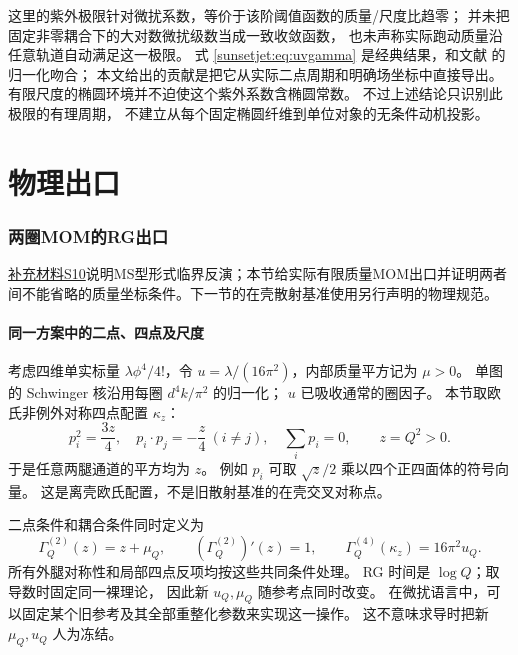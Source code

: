 \documentclass[11pt,a4paper,oneside]{ctexart}
\theoremstyle{cnplain}
\theoremstyle{definition}
\theoremstyle{remark}
\newcommand{\Q}{\mathbb Q}
\newcommand{\Z}{\mathbb Z}
\numberwithin{equation}{section}
\newcommand{\otherref}[2]{\href{#1.pdf}{#2}}
\begin{document}
这里的紫外极限针对微扰系数，等价于该阶阈值函数的质量/尺度比趋零；
并未把固定非零耦合下的大对数微扰级数当成一致收敛函数，
也未声称实际跑动质量沿任意轨道自动满足这一极限。
式 \eqref{sunsetjet:eq:uvgamma} 是经典结果，和文献
\cite[式(1)、(2)、(5)、(9)，$n=1$]{kp} 的归一化吻合；
本文给出的贡献是把它从实际二点周期和明确场坐标中直接导出。
有限尺度的椭圆环境并不迫使这个紫外系数含椭圆常数。
不过上述结论只识别此极限的有理周期，
不建立从每个固定椭圆纤维到单位对象的无条件动机投影。


\endgroup

\clearpage\part{物理出口}

\section{两圈MOM的RG出口}\label{ch:momrg}

\begingroup

\otherref{feynman_periods_supplement}{补充材料S10}说明MS型形式临界反演；本节给实际有限质量MOM出口并证明两者间不能省略的质量坐标条件。下一节的在壳散射基准使用另行声明的物理规范。

\providecommand{\Q}{\mathbb Q}
\providecommand{\SR}{S_{\mathrm R}}
\providecommand{\gphi}{\gamma_\phi}
\providecommand{\dd}{\mathcal D}
\renewcommand{\Z}{\mathcal Z}

\subsection{同一方案中的二点、四点及尺度}
考虑四维单实标量 $\lambda\phi^4/4!$，令
$u=\lambda/(16\pi^2)$，内部质量平方记为 $\mu>0$。
单图的 Schwinger 核沿用每圈 $d^4k/\pi^2$ 的归一化；
$u$ 已吸收通常的圈因子。
本节取欧氏非例外对称四点配置 $\kappa_z$：
\begin{equation}\label{momrg:eq:symmetric}
 p_i^2=\frac{3z}{4},\quad p_i\cdot p_j=-\frac z4\ (i\ne j),
 \quad \sum_i p_i=0,\qquad z=Q^2>0.
\end{equation}
于是任意两腿通道的平方均为 $z$。
例如 $p_i$ 可取 $\sqrt z/2$ 乘以四个正四面体的符号向量。
这是离壳欧氏配置，不是旧散射基准的在壳交叉对称点。

二点条件和耦合条件同时定义为
\begin{equation}\label{momrg:eq:conditions}
 \Gamma_Q^{(2)}(z)=z+\mu_Q,\qquad
 (\Gamma_Q^{(2)})'(z)=1,\qquad
 \Gamma_Q^{(4)}(\kappa_z)=16\pi^2u_Q.
\end{equation}
所有外腿对称性和局部四点反项均按这些共同条件处理。
RG 时间是 $\log Q$；取导数时固定同一裸理论，
因此新 $u_Q,\mu_Q$ 随参考点同时改变。
在微扰语言中，可以固定某个旧参考及其全部重整化参数来实现这一操作。
这不意味求导时把新 $\mu_Q,u_Q$ 人为冻结。
\end{document}
